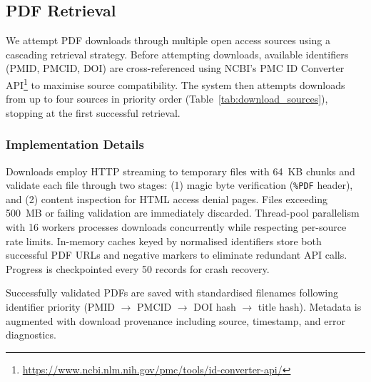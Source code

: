 \subsection{PDF Retrieval}\label{app:article_download}

We attempt PDF downloads through multiple open access sources using a cascading retrieval strategy. Before attempting downloads, available identifiers (PMID, PMCID, DOI) are cross-referenced using NCBI's PMC ID Converter API\footnote{\url{https://www.ncbi.nlm.nih.gov/pmc/tools/id-converter-api/}} to maximise source compatibility. The system then attempts downloads from up to four sources in priority order (Table~\ref{tab:download_sources}), stopping at the first successful retrieval.

\subsubsection{Implementation Details}

Downloads employ HTTP streaming to temporary files with 64~KB chunks and validate each file through two stages: (1) magic byte verification (\texttt{\%PDF} header), and (2) content inspection for HTML access denial pages. Files exceeding 500~MB or failing validation are immediately discarded. Thread-pool parallelism with 16 workers processes downloads concurrently while respecting per-source rate limits. In-memory caches keyed by normalised identifiers store both successful PDF URLs and negative markers to eliminate redundant API calls. Progress is checkpointed every 50 records for crash recovery.

Successfully validated PDFs are saved with standardised filenames following identifier priority (PMID $\rightarrow$ PMCID $\rightarrow$ DOI hash $\rightarrow$ title hash). Metadata is augmented with download provenance including source, timestamp, and error diagnostics.

